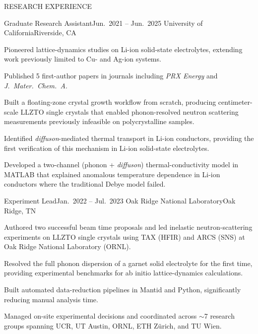 \documentclass{resume} %
\begin{document}

\begin{rSection}{RESEARCH EXPERIENCE}

\begin{rSubsection}
{Graduate Research Assistant}{Jun.\ 2021 -- Jun.\ 2025}
{University of California}{Riverside, CA}
\item Pioneered lattice-dynamics studies on Li-ion solid-state electrolytes, extending work previously limited to Cu- and Ag-ion systems.
\item Published 5 first-author papers in journals including \textit{PRX Energy} and \textit{J.\ Mater.\ Chem.\ A}.
\item Built a floating-zone crystal growth workflow from scratch, producing centimeter-scale LLZTO single crystals that enabled phonon-resolved neutron scattering measurements previously infeasible on polycrystalline samples.
\item Identified \textit{diffuson}-mediated thermal transport in Li-ion conductors, providing the first verification of this mechanism in Li-ion solid-state electrolytes.
\item Developed a two-channel (phonon + \textit{diffuson}) thermal-conductivity model in MATLAB that explained anomalous temperature dependence in Li-ion conductors where the traditional Debye model failed.
\end{rSubsection}

\begin{rSubsection}
{Experiment Lead}{Jan.\ 2022 -- Jul.\ 2023}
{Oak Ridge National Laboratory}{Oak Ridge, TN}
\item Authored two successful beam time proposals and led inelastic neutron-scattering experiments on LLZTO single crystals using TAX (HFIR) and ARCS (SNS) at Oak Ridge National Laboratory (ORNL).
\item Resolved the full phonon dispersion of a garnet solid electrolyte for the first time, providing experimental benchmarks for ab initio lattice-dynamics calculations.
\item Built automated data-reduction pipelines in Mantid and Python, significantly reducing manual analysis time.
\item Managed on-site experimental decisions and coordinated across $\sim$7 research groups spanning UCR, UT Austin, ORNL, ETH Z\"{u}rich, and TU Wien.
\end{rSubsection}


\end{rSection}
\end{document}
